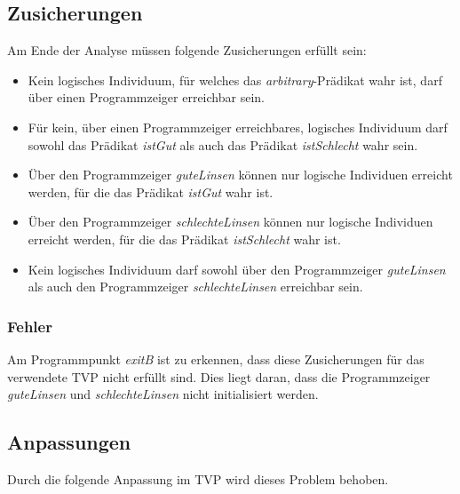 \subsection{Zusicherungen}
Am Ende der Analyse müssen folgende Zusicherungen erfüllt sein:
\begin{itemize}
	\item Kein logisches Individuum, für welches das \emph{arbitrary}-Prädikat wahr ist, darf über einen Programmzeiger erreichbar sein.
	\item Für kein, über einen Programmzeiger erreichbares, logisches Individuum darf sowohl das Prädikat \emph{istGut} als auch das Prädikat \emph{istSchlecht} wahr sein.
	\item Über den Programmzeiger \emph{guteLinsen} können nur logische Individuen erreicht werden, für die das Prädikat \emph{istGut} wahr ist.
	\item Über den Programmzeiger \emph{schlechteLinsen} können nur logische Individuen erreicht werden, für die das Prädikat \emph{istSchlecht} wahr ist.
	\item Kein logisches Individuum darf sowohl über den Programmzeiger \emph{guteLinsen} als auch den Programmzeiger \emph{schlechteLinsen} erreichbar sein.
\end{itemize}


\subsubsection{Fehler}
Am Programmpunkt \emph{exitB} ist zu erkennen, dass diese Zusicherungen für das verwendete TVP nicht erfüllt sind.
Dies liegt daran, dass die Programmzeiger \emph{guteLinsen} und \emph{schlechteLinsen} nicht initialisiert werden.


\subsection{Anpassungen}
Durch die folgende Anpassung im TVP wird dieses Problem behoben.


